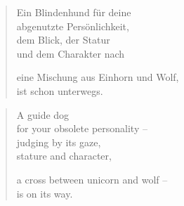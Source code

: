 \clearpage

\begin{verse}

Ein Blindenhund für deine\\
abgenutzte Persönlichkeit,\\
dem Blick, der Statur\\
und dem Charakter nach

eine Mischung aus Einhorn und Wolf,\\
ist schon unterwegs.

\end{verse}

\clearpage

\begin{verse}
A guide dog\\
for your obsolete personality --\\
judging by its gaze,\\
stature and character,

a cross between unicorn and wolf --\\
is on its way.

\end{verse}
